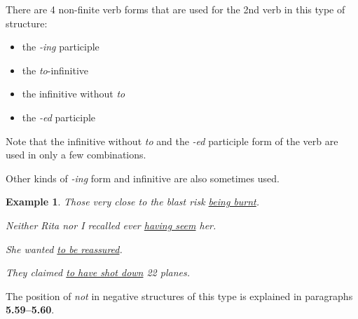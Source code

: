 \documentclass[oneside]{book}
\numberwithin{equation}{section}
\newtheorem{example}{Example}[section]
\begin{document}
%
\noindent{} There are 4 non-finite verb forms that are used for the 2nd verb in this type of structure:
\begin{itemize}
    \item the \textit{-ing} participle
    \item the \textit{to}-infinitive
    \item the infinitive without \textit{to}
    \item the \textit{-ed} participle
\end{itemize}
Note that the infinitive without \textit{to} and the \textit{-ed} participle form of the verb are used in only a few combinations.

%
Other kinds of \textit{-ing} form and infinitive are also sometimes used.
\begin{example}
    Those very close to the blast risk \underline{being burnt}.
    
    Neither Rita nor I recalled ever \underline{having seem} her.
    
    She wanted \underline{to be reassured}.
    
    They claimed \underline{to have shot down} 22 planes.
\end{example}
%
\noindent{} The position of \textit{not} in negative structures of this type is explained in paragraphs \textbf{5.59--5.60}.
\end{document}
